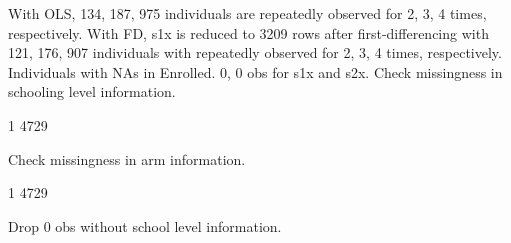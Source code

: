 With OLS,  134, 187, 975 individuals are repeatedly observed for 2, 3, 4 times, respectively. With FD, \textsf{s1x} is reduced to 3209 rows after first-differencing with 121, 176, 907 individuals with repeatedly observed for 2, 3, 4 times, respectively.
Individuals with NAs in \textsf{Enrolled}. 0, 0 obs for \textsf{s1x} and \textsf{s2x}. 
Check missingness in schooling level information.
\begin{Schunk}
\begin{Soutput}
   1 
4729 
\end{Soutput}
\end{Schunk}
Check missingness in arm information.
\begin{Schunk}
\begin{Soutput}
   1 
4729 
\end{Soutput}
\end{Schunk}
Drop 0 obs without school level information.

